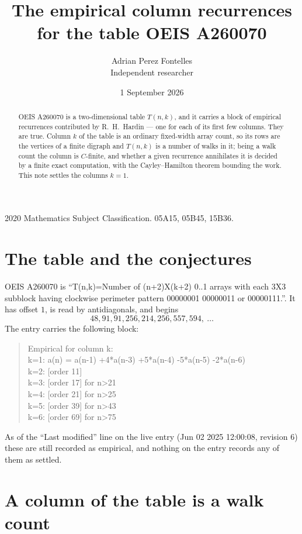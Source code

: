 \documentclass[11pt,a4paper]{article}
\title{The empirical column recurrences for the table OEIS A260070}
\author{Adrian Perez Fontelles\\ \small Independent researcher}
\date{1 September 2026}
\theoremstyle{plain}
\theoremstyle{definition}
\begin{document}
\maketitle

\begin{abstract}
OEIS A260070 is a two-dimensional table $T(n,k)$, and it carries a block of empirical
recurrences contributed by R.~H.~Hardin --- one for each of its first few columns. They are
true. Column $k$ of the table is an ordinary fixed-width array count, so its rows are the
vertices of a finite digraph and $T(n,k)$ is a number of walks in it; being a walk count the
column is $C$-finite, and whether a given recurrence annihilates it is decided by a finite
exact computation, with the Cayley--Hamilton theorem bounding the work. This note settles the columns $k=1$.
\end{abstract}

\noindent\small 2020 Mathematics Subject Classification. 05A15, 05B45, 15B36.\normalsize

\section{The table and the conjectures}

OEIS A260070 is ``T(n,k)=Number of (n+2)X(k+2) 0..1 arrays with each 3X3 subblock having clockwise perimeter pattern 00000001 00000011 or 00000111.''. It has offset $1$, is
read by antidiagonals, and begins
\[
48, 91, 91, 256, 214, 256, 557, 594,\ \dots
\]
The entry carries the following block:
\begin{quote}\small
Empirical for column k:\\
k=1: a(n) = a(n-1) +4*a(n-3) +5*a(n-4) -5*a(n-5) -2*a(n-6)\\
k=2: [order 11]\\
k=3: [order 17] for n>21\\
k=4: [order 21] for n>25\\
k=5: [order 39] for n>43\\
k=6: [order 69] for n>75\\
\end{quote}
As of the ``Last modified'' line on the live entry (Jun 02 2025 12:00:08, revision 6) these are still
recorded as empirical, and nothing on the entry records any of them as settled.

\section{A column of the table is a walk count}
\end{document}
